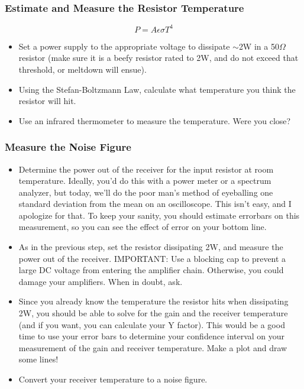 \documentclass[11pt]{article}
\begin{document}
\subsubsection*{Estimate and Measure the Resistor Temperature}
\begin{equation}
P=A\epsilon \sigma T^4
\end{equation}
\begin{itemize}[noitemsep,nolistsep]
\item Set a power supply to the appropriate voltage to dissipate $\sim$2W in a 50$\Omega$ resistor (make
sure it is a beefy resistor rated to 2W, and do not exceed that threshold, or meltdown will ensue).
\item Using the Stefan-Boltzmann Law, calculate what temperature you think the resistor will hit.
\item Use an infrared thermometer to measure the temperature.  Were you close?
\end{itemize}

\subsubsection*{Measure the Noise Figure}
\begin{itemize}[noitemsep,nolistsep]
\item Determine the power out of the receiver for the input resistor at room temperature.  Ideally, you'd do this
with a power meter or a spectrum analyzer, but today, we'll do the poor man's method of eyeballing one
standard deviation from the mean on an oscilloscope.  This isn't easy, and I apologize for that.  To keep your
sanity, you should estimate errorbars on this measurement, so you can see the effect of error on
your bottom line.
\item As in the previous step, set the resistor dissipating 2W, and measure the power out of the receiver.
IMPORTANT: Use a blocking cap to prevent a large DC voltage from entering the amplifier chain.  Otherwise, you
could damage your amplifiers.  When in doubt, ask.
\item Since you already know the temperature the resistor hits when dissipating 2W, you should be able to
solve for the gain and the receiver temperature (and if you want, you can calculate your Y factor).  This
would be a good time to use your error bars to determine your confidence interval on your measurement
of the gain and receiver temperature.  Make a plot and draw some lines!
\item Convert your receiver temperature to a noise figure.
\end{itemize}
\end{document}
